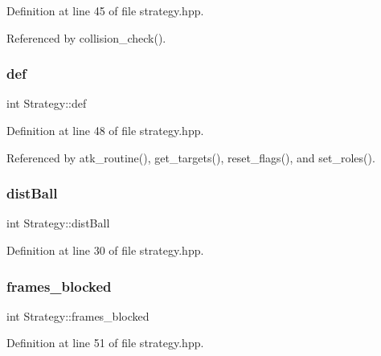 Definition at line 45 of file strategy.\+hpp.



Referenced by collision\+\_\+check().

\mbox{\label{class_strategy_ade11a007d9479832ddc5e69169e23692}} 
\subsubsection{\texorpdfstring{def}{def}}
{\footnotesize\ttfamily int Strategy\+::def}



Definition at line 48 of file strategy.\+hpp.



Referenced by atk\+\_\+routine(), get\+\_\+targets(), reset\+\_\+flags(), and set\+\_\+roles().

\mbox{\label{class_strategy_aff212e34800434ae7fa87fc55bca4531}} 
\subsubsection{\texorpdfstring{dist\+Ball}{distBall}}
{\footnotesize\ttfamily int Strategy\+::dist\+Ball}



Definition at line 30 of file strategy.\+hpp.

\mbox{\label{class_strategy_a46130df98b586fe8b693e62d724c17fb}} 
\subsubsection{\texorpdfstring{frames\+\_\+blocked}{frames\_blocked}}
{\footnotesize\ttfamily int Strategy\+::frames\+\_\+blocked}



Definition at line 51 of file strategy.\+hpp.

\mbox{\label{class_strategy_a7efb4f780b78ee593649340a7f948c36}} 
